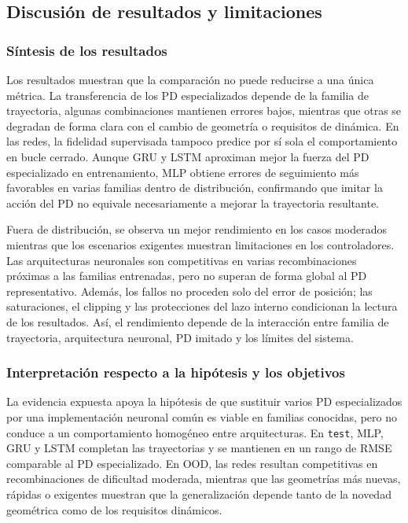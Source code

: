 \subsection{Discusión de resultados y limitaciones}
\label{subsec:discusion-resultados}

\subsubsection*{Síntesis de los resultados}

Los resultados muestran que la comparación no puede reducirse a una única métrica.
La transferencia de los PD especializados depende de la familia de trayectoria,
algunas combinaciones mantienen errores bajos, mientras que otras se degradan de
forma clara con el cambio de geometría o requisitos de dinámica. En las redes, la
fidelidad supervisada tampoco predice por sí sola el comportamiento en bucle
cerrado. Aunque GRU y LSTM aproximan mejor la fuerza del PD especializado en entrenamiento,
MLP obtiene errores de seguimiento más favorables en varias familias dentro de
distribución, confirmando que imitar la acción del PD no equivale necesariamente
a mejorar la trayectoria resultante.

Fuera de distribución, se observa un mejor rendimiento en los casos moderados mientras que
los escenarios exigentes muestran limitaciones en los controladores. Las arquitecturas neuronales
son competitivas en varias recombinaciones próximas a las familias entrenadas, pero no superan de
forma global al PD representativo. Además, los fallos no proceden solo del error de posición;
las saturaciones, el clipping y las protecciones del lazo interno condicionan la lectura de los resultados.
Así, el rendimiento depende de la interacción entre familia de trayectoria, arquitectura
neuronal, PD imitado y los límites del sistema.

\subsubsection*{Interpretación respecto a la hipótesis y los objetivos}

La evidencia expuesta apoya la hipótesis de que sustituir varios PD especializados
por una implementación neuronal común es viable en familias conocidas, pero no
conduce a un comportamiento homogéneo entre arquitecturas. En \texttt{test},
MLP, GRU y LSTM completan las trayectorias y se mantienen en un rango de RMSE
comparable al PD especializado. En OOD, las redes resultan competitivas en
recombinaciones de dificultad moderada, mientras que las geometrías más nuevas,
rápidas o exigentes muestran que la generalización depende tanto de la novedad
geométrica como de los requisitos dinámicos.

